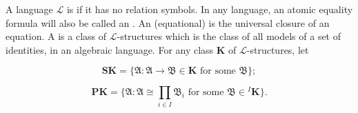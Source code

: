 A language $\mathcal{L}$ is  if it has no relation symbols. In any language, an atomic equality formula will also be called an . An (equational)  is the universal closure of an equation. A  is a class of $\mathcal{L}$-structures which is the class of all models of a set of identities, in an algebraic language. For any class $\mathbf{K}$ of $\mathcal{L}$-structures, let

$$\mathbf{SK} = \{ \mathfrak{A} : \mathfrak{A} \to \mathfrak{B} \in \mathbf{K} \text{ for some } \mathfrak{B} \};$$

$$\mathbf{PK} = \{ \mathfrak{A} : \mathfrak{A} \cong \prod_{i \in I} \mathfrak{B}_i \text{ for some } \mathfrak{B} \in {}^I\mathbf{K} \}.$$
